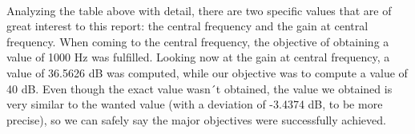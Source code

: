 \paragraph{}Analyzing the table above with detail, there are two specific values that are of great interest to this report: the central frequency and the gain at central frequency. When coming to the central frequency, the objective of obtaining a value of 1000 Hz was fulfilled. Looking now at the gain at central frequency, a value of  36.5626 dB was computed, while our objective was to compute a value of 40 dB. Even though the exact value wasn´t obtained, the value we obtained is very similar to the wanted value (with a deviation of -3.4374 dB, to be more precise), so we can safely say the major objectives were successfully achieved.


